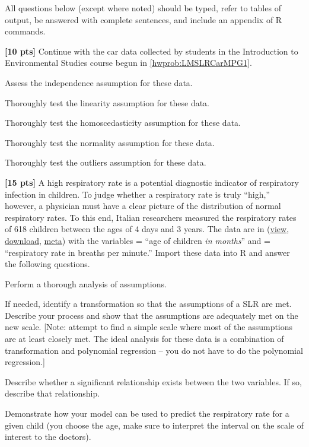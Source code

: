 \documentclass[10pt,openany]{book}\usepackage[]{graphicx}\usepackage[]{color}
\begin{document}
\begin{hwsection}{All questions below (except where noted) should be typed, refer to tables of output, be answered with complete sentences, and include an appendix of R commands.}
\vspace{30pt}
  \item \label{hwprob:LMSLRCarMPG2} \textbf{[10 pts]} Continue with the car data collected by students in the Introduction to Environmental Studies course begun in \ref{hwprob:LMSLRCarMPG1}.
    \begin{Enumerate}
      \item Assess the independence assumption for these data.
      \item Thoroughly test the linearity assumption for these data.
      \item Thoroughly test the homoscedasticity assumption for these data.
      \item Thoroughly test the normality assumption for these data.
      \item Thoroughly test the outliers assumption for these data.
    \end{Enumerate}

\vspace{30pt}
  \item \label{hwprob:LMSLRRusconi} \textbf{[15 pts]} A high respiratory rate is a potential diagnostic indicator of respiratory infection in children.  To judge whether a respiratory rate is truly ``high,'' however, a physician must have a clear picture of the distribution of normal respiratory rates.  To this end, Italian researchers \citep{Rusconietal1994} measured the respiratory rates of 618 children between the ages of 4 days and 3 years.  The data are in  (\href{https://github.com/droglenc/NCData/blob/master/Rusconi.csv}{view}, \href{https://raw.githubusercontent.com/droglenc/NCData/master/Rusconi.csv}{download}, \href{https://github.com/droglenc/NCData/blob/master/Rusconi_meta.txt}{meta}) with the variables  = ``age of children \emph{in months}'' and  = ``respiratory rate in breaths per minute.''  Import these data into R and answer the following questions.
    \begin{Enumerate}
      \item Perform a thorough analysis of assumptions.
      \item If needed, identify a transformation so that the assumptions of a SLR are met.  Describe your process and show that the assumptions are adequately met on the new scale. [Note: attempt to find a simple scale where most of the assumptions are at least closely met.  The ideal analysis for these data is a combination of transformation and polynomial regression -- you do not have to do the polynomial regression.]
      \item Describe whether a significant relationship exists between the two variables.  If so, describe that relationship.
      \item Demonstrate how your model can be used to predict the respiratory rate for a given child (you choose the age, make sure to interpret the interval on the scale of interest to the doctors).
    \end{Enumerate}


\end{hwsection}
\end{document}
